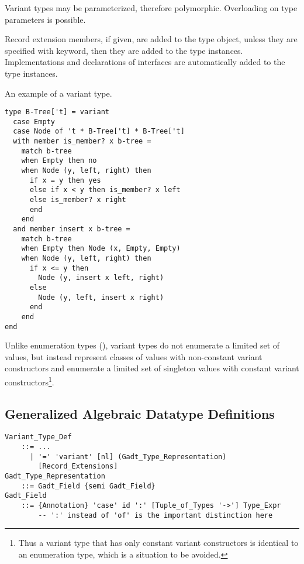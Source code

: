 Variant types may be parameterized, therefore polymorphic. Overloading on type parameters is possible. 

Record extension members, if given, are added to the type object, unless they are specified with  keyword, then they are added to the type instances. Implementations and declarations of interfaces are automatically added to the type instances. 

\example An example of a variant type. 
\begin{lstlisting}
type B-Tree['t] = variant 
  case Empty
  case Node of 't * B-Tree['t] * B-Tree['t]
  with member is_member? x b-tree =
    match b-tree
    when Empty then no
    when Node (y, left, right) then
      if x = y then yes
      else if x < y then is_member? x left
      else is_member? x right
      end 
    end 
  and member insert x b-tree = 
    match b-tree
    when Empty then Node (x, Empty, Empty)
    when Node (y, left, right) then
      if x <= y then 
        Node (y, insert x left, right)
      else 
        Node (y, left, insert x right)
      end
    end
end
\end{lstlisting}

Unlike enumeration types (), variant types do not enumerate a limited set of values, but instead represent classes of values with non-constant variant constructors and enumerate a limited set of singleton values with constant variant constructors\footnote{Thus a variant type that has only constant variant constructors is identical to an enumeration type, which is a situation to be avoided.}. 





\subsection{Generalized Algebraic Datatype Definitions}
\label{sec:gadt-types}

\grammar\begin{lstlisting}
Variant_Type_Def 
    ::= ...
      | '=' 'variant' [nl] (Gadt_Type_Representation) 
        [Record_Extensions]
Gadt_Type_Representation 
    ::= Gadt_Field {semi Gadt_Field}
Gadt_Field 
    ::= {Annotation} 'case' id ':' [Tuple_of_Types '->'] Type_Expr
        -- ':' instead of 'of' is the important distinction here
\end{lstlisting}







